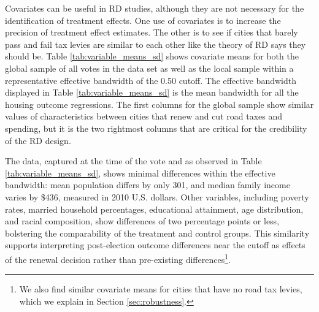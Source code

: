 Covariates can be useful in RD studies, although they are not necessary for the identification of treatment effects.  One use of covariates is to increase the precision of treatment effect estimates.  The other is to see if cities that barely pass and fail tax levies are similar to each other like the theory of RD says they should be. Table \ref{tab:variable_means_sd} shows covariate means for both the global sample of all votes in the data set as well as the local sample within a representative effective bandwidth of the 0.50 cutoff. The effective bandwidth displayed in Table \ref{tab:variable_means_sd} is the mean bandwidth for all the housing outcome regressions. The first columns for the global sample show similar values of characteristics between cities that renew and cut road taxes and spending, but it is the two rightmost columns that are critical for the credibility of the RD design.

The data, captured at the time of the vote and as observed in Table \ref{tab:variable_means_sd}, shows minimal differences within the effective bandwidth: mean population differs by only 301, and median family income varies by \$436, measured in 2010 U.S. dollars. Other variables, including poverty rates, married household percentages, educational attainment, age distribution, and racial composition, show differences of two percentage points or less, bolstering the comparability of the treatment and control groups. This similarity supports interpreting post-election outcome differences near the cutoff as effects of the renewal decision rather than pre-existing differences\footnote{We also find similar covariate means for cities that have no road tax levies, which we explain in Section \ref{sec:robustness}.}.

